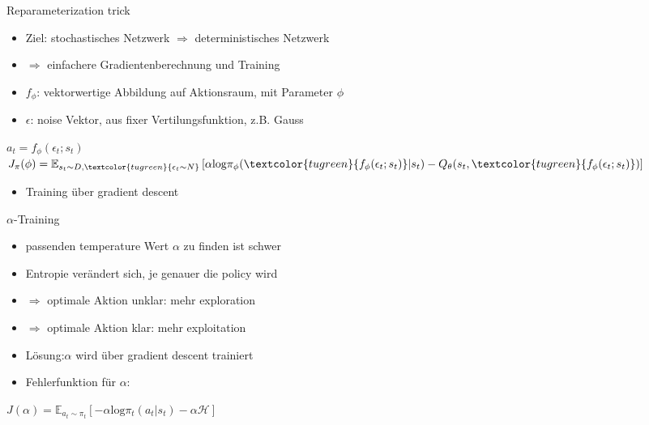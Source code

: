 \begin{frame}{Reparameterization trick}
\begin{itemize}
\item Ziel: stochastisches Netzwerk $\Rightarrow$ deterministisches Netzwerk
\item[] $\Rightarrow$ einfachere Gradientenberechnung und Training
\item $f_{\phi}$: vektorwertige Abbildung auf Aktionsraum, mit Parameter $\phi$
\item $\epsilon$: noise Vektor, aus fixer Vertilungsfunktion, z.B. Gauss \\[12pt]
\end{itemize}
\textcolor{tugreen}{$a_{t}=f_{\phi}(\epsilon_{t};s_{t})$} \\[6pt]
$J_{\pi}(\phi)=\mathbb{E}_{s_{t}\sim D,\textcolor{tugreen}{\epsilon_{t}\sim N}}\left[\alpha\mathrm{log}\pi_{\phi}(\textcolor{tugreen}{f_{\phi}(\epsilon_{t};s_{t})}|s_{t})-Q_{\theta}(s_{t},\textcolor{tugreen}{f_{\phi}(\epsilon_{t};s_{t})})\right]$ \\[12pt]

\begin{itemize}
\item Training über gradient descent
\end{itemize}
\end{frame}

\begin{frame}{$\alpha$-Training}
\begin{itemize}
\item passenden temperature Wert $\alpha$ zu finden ist schwer
\item Entropie verändert sich, je genauer die policy wird
\item[] $\Rightarrow$ optimale Aktion unklar: mehr exploration
\item[] $\Rightarrow$ optimale Aktion klar: mehr exploitation \\[12pt]

\item Lösung:$\alpha$ wird über gradient descent trainiert
\item Fehlerfunktion für $\alpha$:
\end{itemize}
\center$J(\alpha)=\mathbb{E}_{a_{t}\sim\pi_{t}}\left[-\alpha \mathrm{log}\pi_{t}(a_{t}|s_{t})-\alpha \mathcal{H}\right]$
\end{frame}

